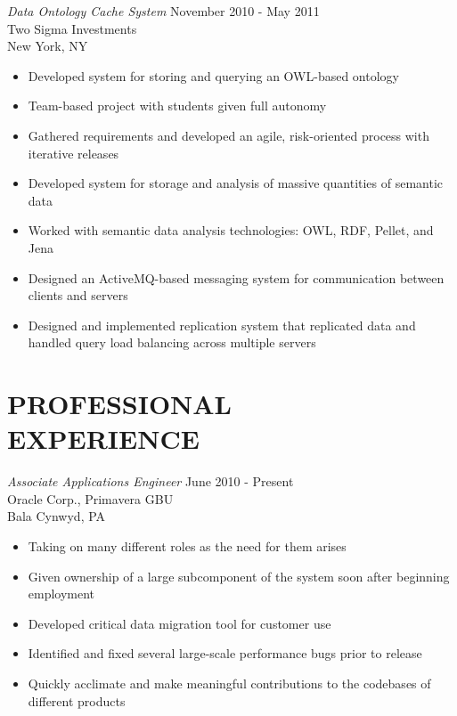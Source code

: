 \documentclass[margin]{res}
\begin{document}
\begin{resume}
        {\sl Data Ontology Cache System} \hfill November 2010 - May 2011 \\
                Two Sigma Investments \\
                New York, NY
                  \begin{itemize} \itemsep -2pt
                   \item Developed system for storing and querying an
                     OWL-based ontology
                   \item Team-based project with students given full autonomy
                   \item Gathered requirements and developed an agile, risk-oriented process with iterative releases
                   \item Developed system for storage and analysis of massive quantities 
                     of semantic data
                   \item Worked with semantic data analysis technologies:
                     OWL, RDF, Pellet, and Jena
                   \item Designed an ActiveMQ-based messaging system for communication between clients and servers
                   \item Designed and implemented replication system that replicated data
                     and handled query load balancing across multiple servers
                  \end{itemize}
 
\section{PROFESSIONAL \\ EXPERIENCE} 
        {\sl Associate Applications Engineer} \hfill June 2010 - Present \\
                Oracle Corp., 
                Primavera GBU \\
                Bala Cynwyd, PA

                 \begin{itemize}  \itemsep -2pt %
                  \item Taking on many different roles as the need for them arises
                  \item Given ownership of a large subcomponent of the system soon after beginning employment
                  \item Developed critical data migration tool for customer use
                  \item Identified and fixed several large-scale performance bugs prior to release
                  \item Quickly acclimate and make meaningful contributions to the codebases of different products
                 \end{itemize}
 

\end{resume}
\end{document}
